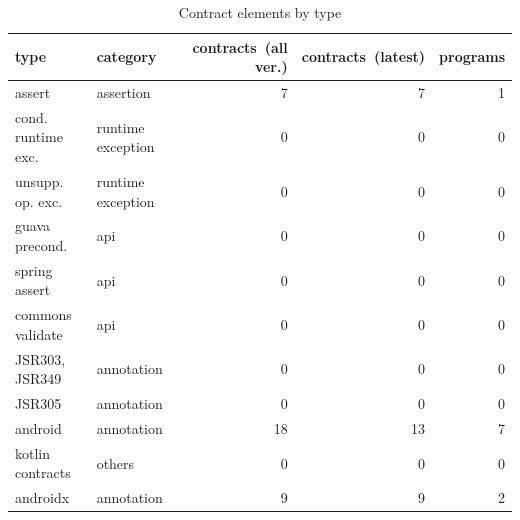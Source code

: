 \begin{table}[]
\centering
\caption{Contract elements by type}
\label{tab:contractsbytype}
\begin{tabular}{|p{5cm}|p{3cm}|r|r|r|} \hline
   type & category & \parbox{1.2cm}{contracts\ (all ver.)}  & \parbox{1.2cm}{contracts\ (latest)} & pro\-grams \\ \hline
	assert &  assertion &  7 &  7 &  1 \\ 
	cond. runtime exc. &  runtime exception &  0 &  0 &  0 \\ 
	unsupp. op. exc. &  runtime exception &  0 &  0 &  0 \\ 
	guava precond. &  api &  0 &  0 &  0 \\ 
	spring assert &  api &  0 &  0 &  0 \\ 
	commons validate &  api &  0 &  0 &  0 \\ 
	JSR303, JSR349 &  annotation &  0 &  0 &  0 \\ 
	JSR305 &  annotation &  0 &  0 &  0 \\ 
	android &  annotation &  18 &  13 &  7 \\ 
	kotlin contracts &  others &  0 &  0 &  0 \\ 
	androidx &  annotation &  9 &  9 &  2 \\ 
\hline
\end{tabular}
\end{table}
